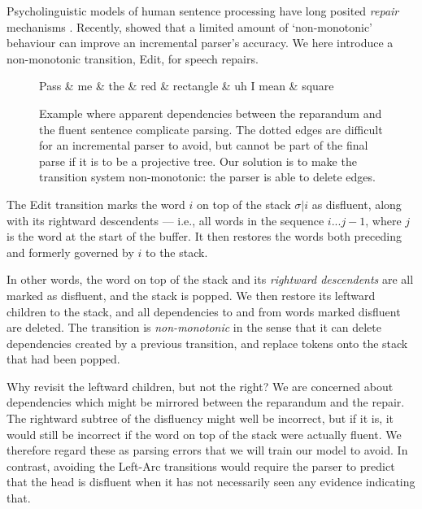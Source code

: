 \documentclass[11pt,letterpaper]{article}
\begin{document}
Psycholinguistic models of human sentence processing have long posited
\emph{repair} mechanisms \citep{FrazierRayner1982}.  Recently, \citet{honnibal:13}
showed that a limited amount of `non-monotonic' behaviour can 
improve an incremental parser's accuracy.
We here introduce a non-monotonic transition, Edit, for speech
repairs. 

\begin{figure}
    \small
\begin{dependency}[theme=simple, segmented edge]
    \begin{deptext}[column sep=.075cm, row sep=.1ex]
    Pass \& me \& the \& red \& rectangle \& uh I mean \& square \\
    \end{deptext}
    \end{dependency}
    \caption{\small Example where apparent dependencies between the reparandum and the
    fluent sentence complicate parsing.  The dotted edges are difficult for an
    incremental parser to avoid, but cannot be part of the final parse if it is to
    be a projective tree. Our solution is to make the transition system non-monotonic:
    the parser is able to delete edges.
\label{fig:rectangle}}
\end{figure}

The Edit transition marks the word $i$ on top of the stack $\sigma | i$ as
disfluent, along with its rightward descendents --- i.e., all words in the
sequence $i...j-1$, where $j$ is the word at the start of the buffer. It then
restores the words both preceding and formerly governed by $i$ to the stack.

In other words, the word on top of the stack and its \emph{rightward descendents}
are all marked as disfluent, and the stack is popped. We then restore its
leftward children to the stack, and
all dependencies to and from words marked disfluent are deleted. 
The transition is \emph{non-monotonic} in the sense that it can delete dependencies
created by a previous transition, and replace tokens onto the stack that had been
popped.

Why revisit the leftward children, but not the right? We
are concerned about dependencies which might be mirrored between the reparandum
and the repair. The rightward subtree of the disfluency might well be incorrect,
but if it is, it would still be incorrect if the word on top of the stack were
actually fluent. We therefore regard these as parsing errors that we will train our model
to avoid. In contrast, avoiding the Left-Arc transitions would require the parser to
predict that the head is disfluent when it has not necessarily seen any evidence
indicating that.
\end{document}
